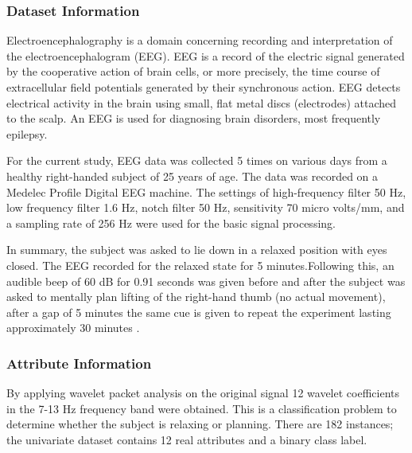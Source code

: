 \documentclass{cmppgr}
\begin{document}
\subsubsection{Dataset Information}
Electroencephalography is a domain concerning recording and interpretation of the electroencephalogram (EEG). EEG is a record of the electric signal generated by the cooperative action of brain cells, or more precisely, the time course of extracellular field potentials generated by their synchronous action\cite{lindsley1950emotions}. EEG detects electrical activity in the brain using small, flat metal discs (electrodes) attached to the scalp. An EEG is used for diagnosing brain disorders, most frequently epilepsy. 



For the current study, EEG data was collected 5 times on various days from a healthy right-handed subject of 25 years of age. The data was recorded on a Medelec Profile Digital EEG machine. The settings of high-frequency filter 50 Hz, low frequency filter 1.6 Hz, notch filter 50 Hz, sensitivity 70 micro volts/mm, and a sampling rate of 256 Hz were used for the basic signal processing. 

In summary, the subject was asked to lie down in a relaxed position with eyes closed. The EEG recorded for the relaxed state for 5 minutes.Following this, an audible beep of 60 dB for 0.91 seconds was given before and after the subject was asked to mentally plan lifting of the right-hand thumb (no actual movement), after a gap of 5 minutes the same cue is given to repeat the experiment lasting approximately 30 minutes \cite{planning_relax_data_set}.

\subsubsection{Attribute Information}
By applying wavelet packet analysis on the original signal 12 wavelet coefficients in the 7-13 Hz frequency band were obtained. This is a classification problem to determine whether the subject is relaxing or planning. There are 182 instances; the univariate dataset contains 12 real attributes and a binary class label.
 
\end{document}
